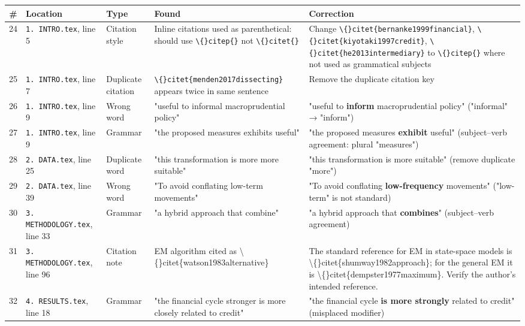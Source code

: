 \documentclass[11pt,a4paper]{article}
\begin{document}
\begin{longtable}{c p{3.2cm} l p{3.8cm} p{3.5cm}}
\toprule
\textbf{\#} & \textbf{Location} & \textbf{Type} & \textbf{Found} & \textbf{Correction} \\
\midrule
\endhead
24 & \texttt{1. INTRO.tex}, line 5 & Citation style & Inline citations used as parenthetical: should use \texttt{\textbackslash\{\}citep\{\}} not \texttt{\textbackslash\{\}citet\{\}} & Change \texttt{\textbackslash\{\}citet\{bernanke1999financial\}}, \texttt{\textbackslash\{\}citet\{kiyotaki1997credit\}}, \texttt{\textbackslash\{\}citet\{he2013intermediary\}} to \texttt{\textbackslash\{\}citep\{\}} where not used as grammatical subjects \\
25 & \texttt{1. INTRO.tex}, line 7 & Duplicate citation & \texttt{\textbackslash\{\}citet\{menden2017dissecting\}} appears twice in same sentence & Remove the duplicate citation key \\
26 & \texttt{1. INTRO.tex}, line 9 & Wrong word & "useful to informal macroprudential policy" & "useful to \textbf{inform} macroprudential policy" ("informal" → "inform") \\
27 & \texttt{1. INTRO.tex}, line 9 & Grammar & "the proposed measures exhibits useful" & "the proposed measures \textbf{exhibit} useful" (subject–verb agreement: plural "measures") \\
28 & \texttt{2. DATA.tex}, line 25 & Duplicate word & "this transformation is more more suitable" & "this transformation is more suitable" (remove duplicate "more") \\
29 & \texttt{2. DATA.tex}, line 39 & Wrong word & "To avoid conflating low-term movements" & "To avoid conflating \textbf{low-frequency} movements" ("low-term" is not standard) \\
30 & \texttt{3. METHODOLOGY.tex}, line 33 & Grammar & "a hybrid approach that combine" & "a hybrid approach that \textbf{combines}" (subject–verb agreement) \\
31 & \texttt{3. METHODOLOGY.tex}, line 96 & Citation note & EM algorithm cited as \textbackslash\{\}citet\{watson1983alternative\} & The standard reference for EM in state-space models is \textbackslash\{\}citet\{shumway1982approach\}; for the general EM it is \textbackslash\{\}citet\{dempster1977maximum\}. Verify the author's intended reference. \\
32 & \texttt{4. RESULTS.tex}, line 18 & Grammar & "the financial cycle stronger is more closely related to credit" & "the financial cycle \textbf{is more strongly} related to credit" (misplaced modifier) \\

\end{longtable}
\end{document}
